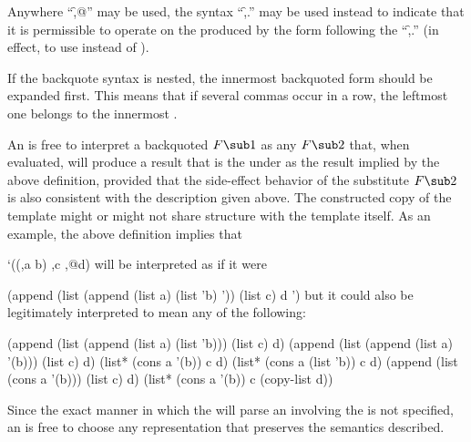 Anywhere ``\f{,@}'' may be used, the syntax ``\f{,.}'' may be used instead
to indicate that it is permissible to operate  on 
the   produced by the form following the ``\f{,.}'' 
(in effect, to use  instead of ).

If the backquote syntax is nested, the innermost backquoted form
should be expanded first.  This means that if several commas occur
in a row, the leftmost one belongs to the innermost .


An  is free to interpret a backquoted  $F\sub 1$
as any  $F\sub 2$ that, when evaluated, will produce a result that is
the  under  as the result implied by the above definition, 
provided that the side-effect behavior of the substitute  $F\sub 2$ 
is also consistent with the description given above.
The constructed
copy of the template might or might not share  structure with the
template itself.  As an example, the above definition implies that

\code
 `((,a b) ,c ,@d)
\endcode
will be interpreted as if it were

\code
 (append (list (append (list a) (list 'b) '\nil)) (list c) d '\nil)
\endcode
but it could also be legitimately interpreted to mean any of the following:

\code
 (append (list (append (list a) (list 'b))) (list c) d)
 (append (list (append (list a) '(b))) (list c) d)
 (list* (cons a '(b)) c d)
 (list* (cons a (list 'b)) c d)
 (append (list (cons a '(b))) (list c) d)
 (list* (cons a '(b)) c (copy-list d))
\endcode
               

Since the exact manner in which the  will parse
an  involving the   
is not specified, an  is free to choose any
representation that preserves the semantics described.

